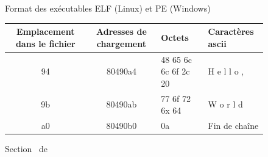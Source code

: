 \begin{figure}
\begin{center}
\end{center}
\caption{Format des exécutables ELF (Linux) et PE (Windows)}
\label{fig:structure_exe}
\end{figure}

\begin{figure}
\begin{center}
\begin{tabular}{|c|c|l|l|}
\hline
Emplacement dans le fichier & Adresses de chargement & Octets & Caractères ascii\\ 
\hline
94 & 80490a4 & 48 65 6c 6c 6f 2c 20 & H e l l o ,   \\
9b & 80490ab & 77 6f 72 6x 64 & W o r l d \\
a0 & 80490b0 & 0a & Fin de chaîne       \\
\hline
\end{tabular}
\end{center}
\caption{Section \pdata\ de \helloworld}
\label{fig:data_helloworld}
\end{figure}

